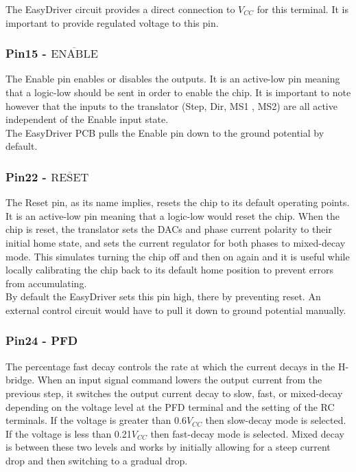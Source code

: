 \documentclass{article}
\theoremstyle{plain}
\theoremstyle{definition}
\theoremstyle{remark}
\begin{document}
The EasyDriver circuit provides a direct connection to $V_{CC}$ for this terminal. It is important to provide regulated voltage to this pin.

\subsubsection*{Pin15 - $\overline{\text{ENABLE}}$}
The Enable pin enables or disables the outputs. It is an active-low pin meaning that a logic-low should be sent in order to enable the chip. It is important to note however that the inputs to the translator (Step, Dir, MS1 , MS2) are all active independent of the Enable input state.\\

The EasyDriver PCB pulls the Enable pin down to the ground potential by default.



\subsubsection*{Pin22 - $\overline{\text{RESET}}$}
The Reset pin, as its name implies, resets the chip to its default operating points. It is an active-low pin meaning that a logic-low would reset the chip. When the chip is reset, the translator sets the DACs and phase current polarity to their initial home state, and sets the current regulator for both phases to mixed-decay mode. This simulates turning the chip off and then on again and it is useful while locally calibrating the chip back to its default home position to prevent errors from accumulating.\\

By default the EasyDriver sets this pin high, there by preventing reset. An external control circuit would have to pull it down to ground potential manually.

\subsubsection*{Pin24 - PFD}
The percentage fast decay controls the rate at which the current decays in the H-bridge. When an input signal command lowers the output current from the previous step, it switches the output current decay to slow, fast, or mixed-decay depending on the voltage level at the PFD terminal and the setting of the RC terminals. If the voltage is greater than 0.6$V_{CC}$ then slow-decay mode is selected.  If the voltage is less than 0.21$V_{CC}$ then fast-decay mode is selected.  Mixed decay is between these two levels and works by initially allowing for a steep current drop and then switching to a gradual drop.\\
\end{document}
